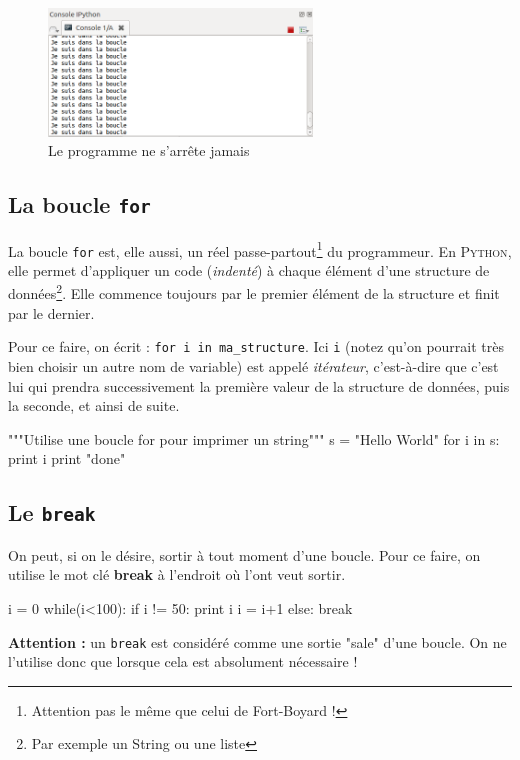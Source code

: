 \begin{figure}[!h]
    \centering
    \includegraphics[width=7cm]{img/boucle_inf.png}
    \caption{Le programme ne s'arrête jamais}
    \label{arbre}
\end{figure}

\subsection{La boucle \texttt{for}}

La boucle \texttt{for} est, elle aussi, un réel passe-partout\footnote{Attention pas le même que celui de Fort-Boyard !} du programmeur. En \textsc{Python}, elle permet d'appliquer un code (\textit{indenté}) à chaque élément d'une structure de données\footnote{Par exemple un String ou une liste}. Elle commence toujours par le premier élément de la structure et finit par le dernier.

Pour ce faire, on écrit : \lstinline{for i in ma_structure}. Ici \texttt{i} (notez qu'on pourrait très bien choisir un autre nom de variable) est appelé \textit{itérateur}, c'est-à-dire que c'est lui qui prendra successivement la première valeur de la structure de données, puis la seconde, et ainsi de suite.

\begin{python}[caption = la boucle for]
"""Utilise une boucle for pour imprimer un string"""
s = "Hello World"
for i in s:
	print i
print "done" 
\end{python}

\subsection{Le \texttt{break}}
On peut, si on le désire, sortir à tout moment d'une boucle. Pour ce faire, on utilise le mot clé \textbf{break} à l'endroit où l'ont veut sortir. 

\begin{python}
i = 0
while(i<100):
	if i != 50:
		print i
		i = i+1
	else:
		break
\end{python}

\textbf{Attention : } un \texttt{break} est considéré comme une sortie "sale" d'une boucle. On ne l'utilise donc que lorsque cela est absolument nécessaire !

